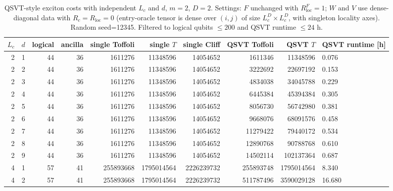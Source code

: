 \begin{table}[t]
\centering
\scriptsize
\caption{QSVT-style exciton costs with independent $L_c$ and $d$, $m = 2$, $D = 2$. Settings: $F$ unchanged with $R_{\mathrm{loc}}^F = 1$; $W$ and $V$ use dense-diagonal data with $R_c = R_{\mathrm{loc}} = 0$ (entry-oracle tensor is dense over $(i, j)$ of size $L_c^D \times L_c^D$, with singleton locality axes). Random seed=12345. Filtered to logical qubits $\leq 200$ and QSVT runtime $\leq 24$ h.}
\begin{tabularx}{\linewidth}{rrrrrrrrr}
\toprule
$L_c$ & $d$ & logical & ancilla & single Toffoli & single $T$ & single Cliff & QSVT Toffoli & QSVT $T$ & QSVT runtime [h] \\
 & 1 & 44 & 36 & 1611276 & 11348596 & 14054652 & 1611346 & 11348596 & 0.076 \\
2 & 2 & 44 & 36 & 1611276 & 11348596 & 14054652 & 3222692 & 22697192 & 0.153 \\
2 & 3 & 44 & 36 & 1611276 & 11348596 & 14054652 & 4834038 & 34045788 & 0.229 \\
2 & 4 & 44 & 36 & 1611276 & 11348596 & 14054652 & 6445384 & 45394384 & 0.305 \\
2 & 5 & 44 & 36 & 1611276 & 11348596 & 14054652 & 8056730 & 56742980 & 0.381 \\
2 & 6 & 44 & 36 & 1611276 & 11348596 & 14054652 & 9668076 & 68091576 & 0.458 \\
2 & 7 & 44 & 36 & 1611276 & 11348596 & 14054652 & 11279422 & 79440172 & 0.534 \\
2 & 8 & 44 & 36 & 1611276 & 11348596 & 14054652 & 12890768 & 90788768 & 0.610 \\
2 & 9 & 44 & 36 & 1611276 & 11348596 & 14054652 & 14502114 & 102137364 & 0.687 \\
4 & 1 & 57 & 41 & 255893668 & 1795014564 & 2226239732 & 255893748 & 1795014564 & 8.340 \\
4 & 2 & 57 & 41 & 255893668 & 1795014564 & 2226239732 & 511787496 & 3590029128 & 16.680 \\
\bottomrule
\end{tabularx}
\end{table}
